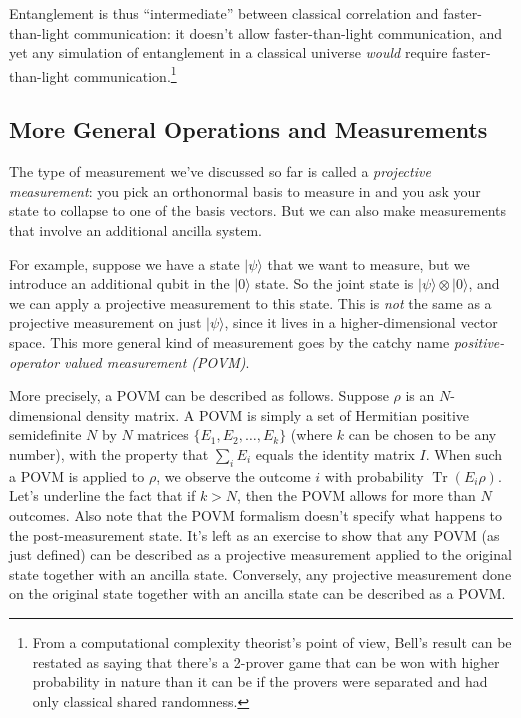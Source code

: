 \documentclass[12pt]{report}
\theoremstyle{plain}
\theoremstyle{definition}
\renewcommand{\ket}[1]{|#1\rangle}
\newcommand{\tensor}{\otimes}
\newcommand{\Tr}{\operatorname{Tr}}
\begin{document}
Entanglement is thus ``intermediate'' between classical correlation and faster-than-light communication: it doesn't allow faster-than-light communication, and yet any simulation of entanglement in a classical universe \emph{would} require faster-than-light communication.\footnote{From a computational complexity theorist's point of view, Bell's result can be restated as saying that there's a 2-prover game that can be won with higher probability in nature than it can be if the provers were separated and had only classical shared randomness.}


\subsection{More General Operations and Measurements}

The type of measurement we've discussed so far is called a \emph{projective measurement}: you pick an orthonormal basis to measure in and you ask your state to collapse to one of the basis vectors. But we can also make measurements that involve an additional ancilla system.

For example, suppose we have a state $\ket{\psi}$ that we want to measure, but we introduce an additional qubit in the $\ket{0}$ state. So the joint state is $\ket{\psi} \tensor \ket{0}$, and we can apply a projective measurement to this state. This is {\em not} the same as a projective measurement on just $\ket{\psi}$, since it lives in a higher-dimensional vector space. This more general kind of measurement goes by the catchy name {\em positive-operator valued measurement (POVM)}.

More precisely, a POVM can be described as follows. Suppose $\rho$ is an $N$-dimensional density matrix. A POVM is simply a set of Hermitian positive semidefinite $N$ by $N$ matrices $\{E_1, E_2, \ldots, E_k\}$ (where $k$ can be chosen to be any number), with the property that $\sum_i E_i$ equals the identity matrix $I$. When such a POVM is applied to $\rho$, we observe the outcome $i$ with probability $\Tr(E_i \rho)$. Let's underline the fact that if $k > N$, then the POVM allows for more than $N$ outcomes. Also note that the POVM formalism doesn't specify what happens to the post-measurement state. It's left as an exercise to show that any POVM (as just defined) can be described as a projective measurement applied to the original state together with an ancilla state. Conversely, any projective measurement done on the original state together with an ancilla state can be described as a POVM.
\end{document}
